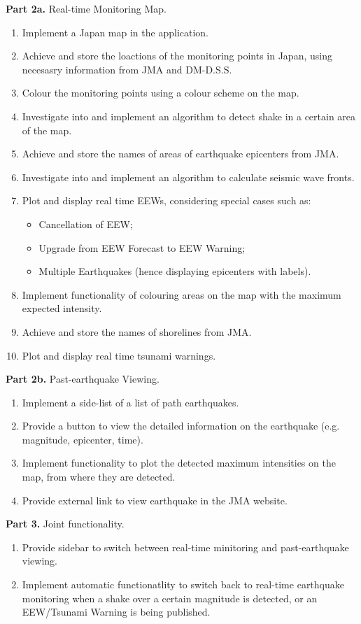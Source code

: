 \documentclass[10pt]{article}
\begin{document}
\textbf{Part 2a.} Real-time Monitoring Map.
\begin{enumerate}
    \item Implement a Japan map in the application.
    \item Achieve and store the loactions of the monitoring points in Japan, using necesasry information from JMA and DM-D.S.S.
    \item Colour the monitoring points using a colour scheme on the map.
    \item Investigate into and implement an algorithm to detect shake in a certain area of the map.
    \item Achieve and store the names of areas of earthquake epicenters from JMA.
    \item Investigate into and implement an algorithm to calculate seismic wave fronts.
    \item Plot and display real time EEWs, considering special cases such as:
          \begin{itemize}
              \item Cancellation of EEW;
              \item Upgrade from EEW Forecast to EEW Warning;
              \item Multiple Earthquakes (hence displaying epicenters with labels).
          \end{itemize}
    \item Implement functionality of colouring areas on the map with the maximum expected intensity.
    \item Achieve and store the names of shorelines from JMA.
    \item Plot and display real time tsunami warnings.
\end{enumerate}

\textbf{Part 2b.} Past-earthquake Viewing.
\begin{enumerate}
    \item Implement a side-list of a list of path earthquakes.
    \item Provide a button to view the detailed information on the earthquake (e.g. magnitude, epicenter, time).
    \item Implement functionality to plot the detected maximum intensities on the map, from where they are detected.
    \item Provide external link to view earthquake in the JMA website.
\end{enumerate}

\textbf{Part 3.} Joint functionality.
\begin{enumerate}
    \item Provide sidebar to switch between real-time minitoring and past-earthquake viewing.
    \item Implement automatic functionatlity to switch back to real-time earthquake monitoring when a shake over a certain magnitude is detected, or an EEW/Tsunami Warning is being published.
\end{enumerate}
\end{document}
